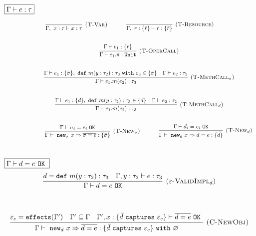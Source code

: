 \documentclass{llncs}
\newcommand{\keywadj}[1]{\mathtt{#1}}
\newcommand{\keyw}[1]{\keywadj{#1}~}
\begin{document}
$\fbox{$\Gamma \vdash e : \tau$}$

\[
\begin{array}{c}
\infer[\textsc{(T-Var)}]
	{\Gamma,~x : \tau \vdash x : \tau}
	{}
~~~~~~~~~~
\infer[\textsc{(T-Resource)}]
	{\Gamma,~r : \{ \bar r \} \vdash r : \{ \bar r \}}
	{} \\[5ex]
~~~~~~~~~~
\infer[\textsc{(T-OperCall)}]
	{\Gamma \vdash e_1.\pi : \keywadj{Unit}}
	{\Gamma \vdash e_1 : \{ \bar r \}} \\[5ex]
~~~~~~~~~~
\infer[\textsc{(T-MethCall$_\sigma$)}]
	{\Gamma \vdash e_1.m(e_2) : \tau_3}
	{\Gamma \vdash e_1 : \{ \bar \sigma \},~\keyw{def} m(y : \tau_2) : \tau_3~\keyw{with} \varepsilon_3 \in \{ \bar \sigma \} &  \Gamma \vdash e_2 : \tau_2 }\\[5ex]
~~~~~~~~~~
\infer[\textsc{(T-MethCall$_d$)}]
	{\Gamma \vdash e_1.m(e_2) : \tau_3}
	{\Gamma \vdash e_1 : \{ \bar d\},~\keyw{def} m(y : \tau_2) : \tau_3 \in \{ \bar d \} &  \Gamma \vdash e_2 : \tau_2 }\\[5ex]
~~~~~~~~~~

~~~~~~~~~~
\infer[\textsc{(T-New$_\sigma$)}]
	{\Gamma \vdash~\keywadj{new}_\sigma~x \Rightarrow \overline{\sigma = e} : \{ \bar \sigma \}}
	{\Gamma \vdash \sigma_i = e_i~\keywadj{OK}}
~~~~~~~~~~
\infer[\textsc{(T-New$_d$)}]
	{\Gamma \vdash~\keywadj{new}_d~x \Rightarrow \overline{d = e} : \{ \bar d \}}
	{\Gamma \vdash d_i = e_i~\keywadj{OK}}\\[5ex]
\end{array}
\]

$\fbox{$\Gamma \vdash d = e~\keyw{OK}$}$
\[
\begin{array}{c}
\infer[\textsc{($\varepsilon$-ValidImpl$_d$)}]
	{\Gamma \vdash d = e~\keywadj{OK}}
	{d = \keyw{def} m(y : \tau_2) : \tau_3 & \Gamma, y : \tau_2 \vdash e : \tau_3}
	\\[5ex]
\end{array}
\]

\fbox{$\Gamma \vdash e : \tau~\keyw{with} \varepsilon$}

\[
\begin{array}{c}
\infer[\textsc{(C-NewObj)}]
	{\Gamma \vdash~\keywadj{new}_d~x \Rightarrow \overline{d = e} : \{  \bar d~\keyw{captures} \varepsilon_c \} ~\keyw{with} \varnothing }
	{\varepsilon_c = \keywadj{effects}(\Gamma') & \Gamma' \subseteq \Gamma & \Gamma', x : \{ \bar d~\keyw {captures} \varepsilon_c \} \vdash \overline{d = e}~\keyw{OK}} \\[5ex]
\end{array}
\]
\end{document}
